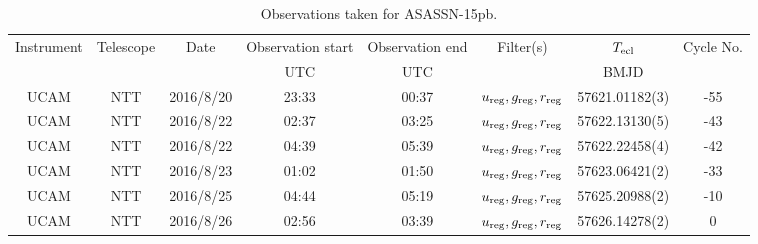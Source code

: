 \begin{table}
	\begin{center}
		\begin{tabular}{cccccccc}
			\hline
			Instrument & Telescope & Date & Observation start & Observation end & Filter(s) & $T_{\rm ecl}$ & Cycle No. \\
			 &  &  & UTC & UTC &  & BMJD &  \\
			\hline
			\hline
			UCAM & NTT & 2016/8/20 & 23:33 & 00:37 & $u_{\rm reg},g_{\rm reg},r_{\rm reg}$ & 57621.01182(3) & -55 \\
			UCAM & NTT & 2016/8/22 & 02:37 & 03:25 & $u_{\rm reg},g_{\rm reg},r_{\rm reg}$ & 57622.13130(5) & -43 \\
			UCAM & NTT & 2016/8/22 & 04:39 & 05:39 & $u_{\rm reg},g_{\rm reg},r_{\rm reg}$ & 57622.22458(4) & -42 \\
			UCAM & NTT & 2016/8/23 & 01:02 & 01:50 & $u_{\rm reg},g_{\rm reg},r_{\rm reg}$ & 57623.06421(2) & -33 \\
			UCAM & NTT & 2016/8/25 & 04:44 & 05:19 & $u_{\rm reg},g_{\rm reg},r_{\rm reg}$ & 57625.20988(2) & -10 \\
			UCAM & NTT & 2016/8/26 & 02:56 & 03:39 & $u_{\rm reg},g_{\rm reg},r_{\rm reg}$ & 57626.14278(2) &   0 \\
		   \hline
		\end{tabular}
	\end{center}
	\caption{Observations taken for ASASSN-15pb.}
	\label{table:observing:observation logs ASASSN-15pb}
\end{table}